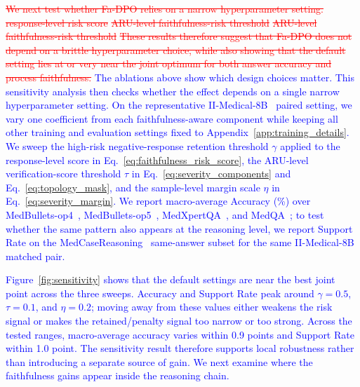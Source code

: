 \documentclass[a4paper,fleqn,doubleblind]{cas-sc}
\DeclareRobustCommand{\deleted}[1]{\textcolor{red}{\sout{#1}}}
\DeclareRobustCommand{\added}[1]{\textcolor{blue}{#1}}
\begin{document}
\deleted{We next test whether Fa-DPO relies on a narrow hyperparameter setting.}
\deleted{response-level risk score}
\deleted{ARU-level faithfulness-risk threshold}
\deleted{ARU-level faithfulness-risk threshold}
\deleted{These results therefore suggest that Fa-DPO does not depend on a brittle hyperparameter choice, while also showing that the default setting lies at or very near the joint optimum for both answer accuracy and process faithfulness.}
\added{The ablations above show which design choices matter. This sensitivity analysis then checks whether the effect depends on a single narrow hyperparameter setting. On the representative II-Medical-8B~\cite{intelligentinternet2025iimedical8b} paired setting, we vary one coefficient from each faithfulness-aware component while keeping all other training and evaluation settings fixed to Appendix~\ref{app:training_details}. We sweep the high-risk negative-response retention threshold $\gamma$ applied to the response-level score in Eq.~\ref{eq:faithfulness_risk_score}, the ARU-level verification-score threshold $\tau$ in Eq.~\ref{eq:severity_components} and Eq.~\ref{eq:topology_mask}, and the sample-level margin scale $\eta$ in Eq.~\ref{eq:severity_margin}. We report macro-average Accuracy (\%) over MedBullets-op4~\cite{chen2025benchmarking}, MedBullets-op5~\cite{chen2025benchmarking}, MedXpertQA~\cite{zuo2025medxpertqa}, and MedQA~\cite{jin2021disease}; to test whether the same pattern also appears at the reasoning level, we report Support Rate on the MedCaseReasoning~\cite{wu2025medcasereasoning} same-answer subset for the same II-Medical-8B matched pair.}

\added{Figure~\ref{fig:sensitivity} shows that the default settings are near the best joint point across the three sweeps. Accuracy and Support Rate peak around $\gamma=0.5$, $\tau=0.1$, and $\eta=0.2$; moving away from these values either weakens the risk signal or makes the retained/penalty signal too narrow or too strong. Across the tested ranges, macro-average accuracy varies within 0.9 points and Support Rate within 1.0 point. The sensitivity result therefore supports local robustness rather than introducing a separate source of gain. We next examine where the faithfulness gains appear inside the reasoning chain.}
\end{document}
